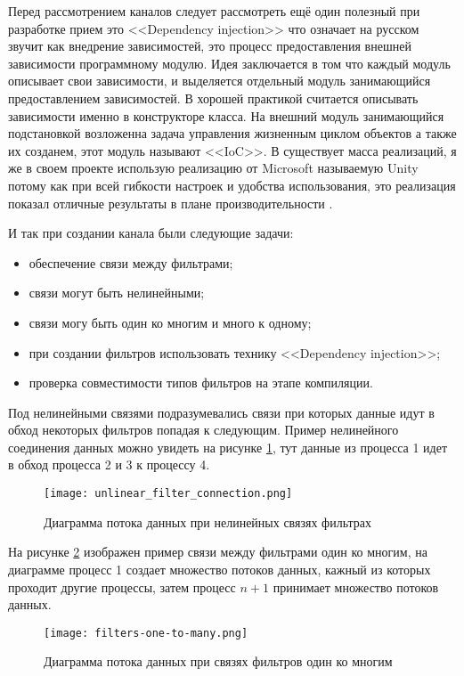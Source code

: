 Перед рассмотрением каналов следует рассмотреть ещё один полезный при разработке прием это <<Dependency injection>> что означает на русском звучит как внедрение зависимостей, это процесс предоставления внешней зависимости программному модулю. Идея заключается в том что каждый модуль описывает свои зависимости, и выделяется отдельный модуль занимающийся предоставлением зависимостей. В \csharp{} хорошей практикой считается описывать зависимости именно в конструкторе класса. На внешний модуль занимающийся подстановкой возложенна задача управления жизненным циклом объектов а также их созданем, этот модуль называют <<IoC>>. В \dotnet{} существует масса реализаций, я же в своем проекте использую реализацию от Microsoft называемую Unity потому как при всей гибкости настроек и удобства использования, это реализация показал отличные результаты в плане производительности \cite{ioc_perfomance}.

И так при создании канала были следующие задачи:
\begin{itemize}
  \item обеспечение связи между фильтрами;
  \item связи могут быть нелинейными;
  \item связи могу быть один ко многим и много к одному;
  \item при создании фильтров использовать технику <<Dependency injection>>;
  \item проверка совместимости типов фильтров на этапе компиляции.
\end{itemize}

Под нелинейными связями подразумевались связи при которых данные идут в обход некоторых фильтров попадая к следующим. Пример нелинейного соединения данных можно увидеть на рисунке \ref{fig:creation:unlinear_filter_connection}, тут данные из процесса 1 идет в обход процесса 2 и 3 к процессу 4.
\begin{figure}[ht] 
    \centering
    \texttt{[image: unlinear\_filter\_connection.png]}  
    \caption{Диаграмма потока данных при нелинейных связях фильтрах}
    \label{fig:creation:unlinear_filter_connection}
\end{figure}

На рисунке \ref{fig:creation:filters-one-to-many} изображен пример связи между фильтрами один ко многим, на диаграмме процесс 1 создает множество потоков данных, кажный из которых проходит другие процессы, затем процесс $n+1$ принимает множество потоков данных.
\begin{figure}[ht] 
    \centering
    \texttt{[image: filters-one-to-many.png]}  
    \caption{Диаграмма потока данных при связях фильтров один ко многим}
    \label{fig:creation:filters-one-to-many}
\end{figure}

